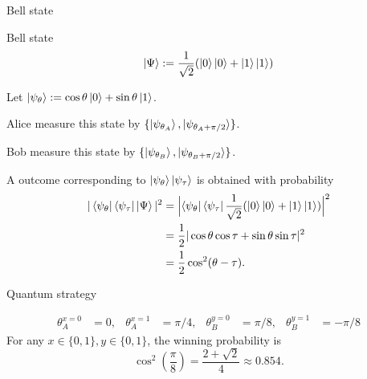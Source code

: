 \documentclass{beamer}
\begin{document}
\begin{frame}{Bell state}
\small

Bell state
\begin{equation*}
\ket{\Psi}:=
\frac1{\sqrt{2}}(\ket{0}\ket{0} + \ket{1}\ket{1})
\end{equation*}

\vspace{2em}
Let $\ket{\psi_\theta} := \cos\theta\ket{0}+\sin\theta\ket{1}$.

Alice measure this state by $\{\ket{\psi_{\theta_A}}, \ket{\psi_{\theta_A+\pi/2}}\}$.

Bob measure this state by $\{\ket{\psi_{\theta_B}}, \ket{\psi_{\theta_B+\pi/2}}\}$.

\vspace{2em}
A outcome corresponding to $\ket{\psi_\theta}\ket{\psi_\tau}$ is obtained with probability
\begin{align*}
|\bra{\psi_{\theta}}\bra{\psi_{\tau}}\ket{\Psi}|^2
&=\Bigl|\bra{\psi_{\theta}}\bra{\psi_{\tau}}
\frac1{\sqrt{2}}(\ket{0}\ket{0} + \ket{1}\ket{1})\Bigr|^2\\
&=\frac12 |\cos\theta\cos\tau + \sin\theta\sin\tau|^2\\
&=\frac12 \cos^2(\theta-\tau).
\end{align*}
\end{frame}

\begin{frame}{Quantum strategy}
\begin{center}
\end{center}
\begin{align*}
\theta_A^{x=0} &= 0, & \theta_A^{x=1} &= \pi/4, &
\theta_B^{y=0} &= \pi/8, & \theta_B^{y=1} &= -\pi/8
\end{align*}
For any $x\in\{0,1\}, y\in\{0,1\}$, the winning probability is
\begin{equation*}
\cos^2\left(\frac{\pi}8\right)
=
\frac{2+\sqrt{2}}4
\approx 0.854.
\end{equation*}
\end{frame}
\end{document}
